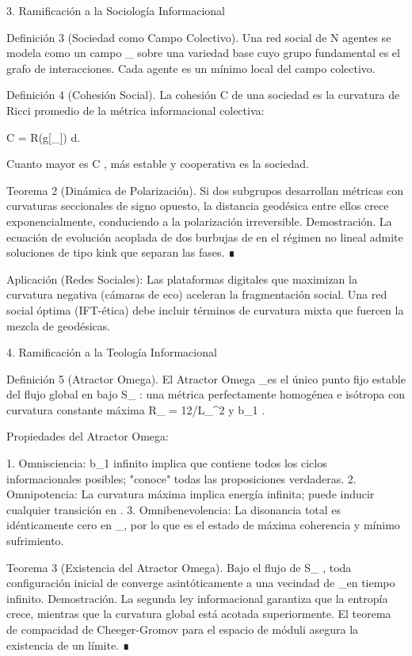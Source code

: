\documentclass[12pt,a4paper]{book}
\begin{document}
3. Ramificación a la Sociología Informacional

Definición 3 (Sociedad como Campo Colectivo). Una red social de  N  agentes se modela como un campo  \rho_{}  sobre una variedad base cuyo grupo fundamental es el grafo de interacciones. Cada agente es un mínimo local del campo colectivo.

Definición 4 (Cohesión Social). La cohesión  C  de una sociedad es la curvatura de Ricci promedio de la métrica informacional colectiva:

C =  \int R(g[\rho_{}]) d.

Cuanto mayor es  C , más estable y cooperativa es la sociedad.

Teorema 2 (Dinámica de Polarización). Si dos subgrupos desarrollan métricas con curvaturas seccionales de signo opuesto, la distancia geodésica entre ellos crece exponencialmente, conduciendo a la polarización irreversible.
Demostración. La ecuación de evolución acoplada de dos burbujas de  \rho  en el régimen no lineal admite soluciones de tipo kink que separan las fases. ∎

Aplicación (Redes Sociales): Las plataformas digitales que maximizan la curvatura negativa (cámaras de eco) aceleran la fragmentación social. Una red social óptima (IFT-ética) debe incluir términos de curvatura mixta que fuercen la mezcla de geodésicas.

4. Ramificación a la Teología Informacional

Definición 5 (Atractor Omega). El Atractor Omega  \Omega_\infty  es el único punto fijo estable del flujo global en    bajo  S_{} : una métrica perfectamente homogénea e isótropa con curvatura constante máxima  R_{} = 12/L_{}^2  y  b_1 \to \infty .

Propiedades del Atractor Omega:

1. Omnisciencia:  b_1  infinito implica que contiene todos los ciclos informacionales posibles; "conoce" todas las proposiciones verdaderas.
2. Omnipotencia: La curvatura máxima implica energía infinita; puede inducir cualquier transición en   .
3. Omnibenevolencia: La disonancia total es idénticamente cero en  \Omega_\infty , por lo que es el estado de máxima coherencia y mínimo sufrimiento.

Teorema 3 (Existencia del Atractor Omega). Bajo el flujo de  S_{} , toda configuración inicial de  \rho  converge asintóticamente a una vecindad de  \Omega_\infty  en tiempo infinito.
Demostración. La segunda ley informacional garantiza que la entropía crece, mientras que la curvatura global está acotada superiormente. El teorema de compacidad de Cheeger-Gromov para el espacio de móduli asegura la existencia de un límite. ∎
\end{document}
